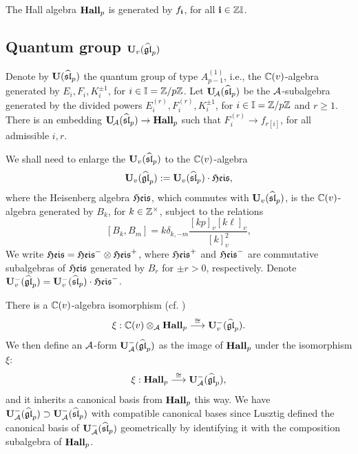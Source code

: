\begin{proposition}  \cite{VV99, DF15} 
\label{prop:generators}
    The Hall algebra $\bold{Hall}_{p}$ is generated by $f_{\mathbf{i}}$, for all $\mathbf{i}\in \mathbb{Z}\mathbb{I}$. 
\end{proposition}

\subsection{Quantum group $\bold{U}_v(\widehat{\mathfrak{gl}}_p)$}

Denote by $\bold{U}(\widehat{\mathfrak{sl}}_p)$ the quantum group of type $A_{p-1}^{(1)}$, i.e., the $\mathbb{C}(v)$-algebra generated by $E_i, F_i, K_i^{\pm 1}$, for $i\in \mathbb{I}=\mathbb{Z}/p\mathbb{Z}$. Let $\bold{U}\!_{\mathcal{A}}(\widehat{\mathfrak{sl}}_p)$ be the $\mathcal{A}$-subalgebra generated by the divided powers $E_i^{(r)}, F_i^{(r)}, K_i^{\pm 1}$, for $i\in \mathbb{I}=\mathbb{Z}/p\mathbb{Z}$ and $r\ge 1$.
There is an embedding $\bold{U}\!_{\mathcal{A}}(\widehat{\mathfrak{sl}}_p) \rightarrow \bold{Hall}_{p}$ such that $F_i^{(r)} \rightarrow f_{r[i]}$, for all admissible $i, r$. 

We shall need to enlarge the $\bold{U}_v(\widehat{\mathfrak{sl}}_p)$ to the $\mathbb{C}(v)$-algebra 
\begin{align} \label{eq:affine_glp}
\bold{U}_v(\widehat{\mathfrak{gl}}_p):=\bold{U}_v(\widehat{\mathfrak{sl}}_p) \cdot \mathfrak{Heis},
\end{align}
where the Heisenberg algebra $\mathfrak{Heis}$, which  commutes with $\bold{U}_v(\widehat{\mathfrak{sl}}_p)$, is the $\mathbb{C}(v)$-algebra generated by $B_k$, for $k\in \mathbb{Z}^\times$, subject to the relations \cite{KMS95, LT96, Ugl00} 
\[
[B_k, B_m]= k\delta_{k,-m} \frac{[kp]_v[k\ell]_v}{[k]_v^2},
\]
We write
$\mathfrak{Heis} =\mathfrak{Heis}^- \otimes \mathfrak{Heis}^+$, where $\mathfrak{Heis}^+$ and $\mathfrak{Heis}^-$ are commutative subalgebras of $\mathfrak{Heis}$ generated by $B_r$ for $\pm r>0$, respectively. Denote $\bold{U}^-_v(\widehat{\mathfrak{gl}}_p) = \bold{U}^-_v(\widehat{\mathfrak{sl}}_p) \cdot\mathfrak{Heis}^-$.

There is a $\mathbb{C}(v)$-algebra isomorphism (cf. \cite{X97, Sch00, DF15})
\begin{align}
    \label{eq:isom}
    \xi: \mathbb{C}(v) \otimes_{\mathcal{A}}\bold{Hall}_{p} \stackrel{\cong}{\longrightarrow}  \bold{U}_v^-(\widehat{\mathfrak{gl}}_p).
\end{align}
We then define an $\mathcal{A}$-form $\bold{U}_{\mathcal{A}}^-(\widehat{\mathfrak{gl}}_p)$ as the image of $\bold{Hall}_{p}$ under the isomorphism $\xi$:
\[
\xi: \bold{Hall}_{p} \stackrel{\cong}{\longrightarrow} \bold{U}_{\mathcal{A}}^-(\widehat{\mathfrak{gl}}_p), 
\]
and it inherits a canonical basis from $\bold{Hall}_{p}$ this way. We have $\bold{U}_{\mathcal{A}}^-(\widehat{\mathfrak{gl}}_p)\supset \bold{U}_{\mathcal{A}}^-(\widehat{\mathfrak{sl}}_p)$ with compatible canonical bases since Lusztig \cite{Lus90, Lus98} defined the canonical basis of $\bold{U}_{\mathcal{A}}^-(\widehat{\mathfrak{sl}}_p)$ geometrically by identifying it with the composition subalgebra of $\bold{Hall}_{p}$.



